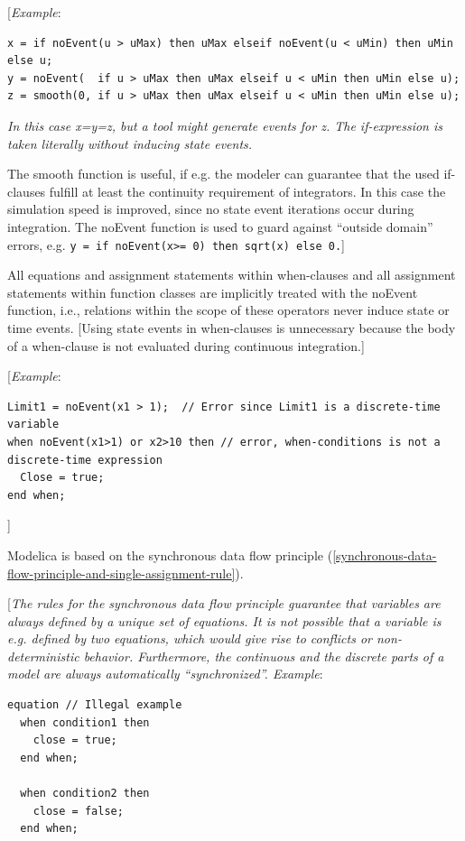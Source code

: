 \documentclass[10pt,a4paper]{report}
\begin{document}
{[}\emph{Example}:
\begin{lstlisting}[language=modelica]
x = if noEvent(u > uMax) then uMax elseif noEvent(u < uMin) then uMin else u; 
y = noEvent(  if u > uMax then uMax elseif u < uMin then uMin else u); 
z = smooth(0, if u > uMax then uMax elseif u < uMin then uMin else u); 
\end{lstlisting}

\emph{In this case x=y=z, but a tool might generate events for z. The
if-expression is taken literally without inducing state events.}

The smooth function is useful, if e.g. the modeler can guarantee that
the used if-clauses fulfill at least the continuity requirement of
integrators. In this case the simulation speed is improved, since no
state event iterations occur during integration. The noEvent function is
used to guard against ``outside domain'' errors, e.g. \lstinline!y = if noEvent(x>= 0) then sqrt(x) else 0.!{]}

All equations and assignment statements within when-clauses and all
assignment statements within function classes are implicitly treated
with the noEvent function, i.e., relations within the scope of these
operators never induce state or time events. {[}Using state events in
when-clauses is unnecessary because the body of a when-clause is not
evaluated during continuous integration.{]}

{[}\emph{Example}:
\begin{lstlisting}[language=modelica]
Limit1 = noEvent(x1 > 1);  // Error since Limit1 is a discrete-time variable 
when noEvent(x1>1) or x2>10 then // error, when-conditions is not a discrete-time expression   
  Close = true; 
end when; 
\end{lstlisting}

{]}

Modelica is based on the synchronous data flow principle (\ref{synchronous-data-flow-principle-and-single-assignment-rule}).

{[}\emph{The rules for the synchronous data flow principle guarantee
that variables are always defined by a unique set of equations. It is
not possible that a variable is e.g. defined by two equations, which
would give rise to conflicts or non-deterministic behavior. Furthermore,
the continuous and the discrete parts of a model are always
automatically ``synchronized''. Example}:

\begin{lstlisting}[language=modelica]
equation // Illegal example
  when condition1 then
    close = true;
  end when; 
 
  when condition2 then
    close = false;
  end when;
\end{lstlisting}
\end{document}
